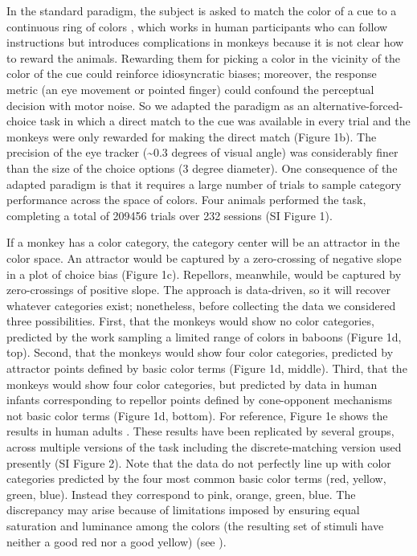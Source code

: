 In the standard paradigm, the subject is asked to match the color of a cue to a continuous ring of colors \citep{wilken_detection_2004,zhang_discrete_2008,bae_why_2015,panichello_error-correcting_2019,schurgin_psychophysical_2020}, which works in human participants who can follow instructions but introduces complications in monkeys because it is not clear how to reward the animals. Rewarding them for picking a color in the vicinity of the color of the cue could reinforce idiosyncratic biases\citep{panichello_error-correcting_2019}; moreover, the response metric (an eye movement or pointed finger) could confound the perceptual decision with motor noise. So we adapted the paradigm as an alternative-forced-choice task in which a direct match to the cue was available in every trial and the monkeys were only rewarded for making the direct match (Figure 1b). The precision of the eye tracker (\textasciitilde0.3 degrees of visual angle) was considerably finer than the size of the choice options (3 degree diameter). One consequence of the adapted paradigm is that it requires a large number of trials to sample category performance across the space of colors. Four animals performed the task, completing a total of 209456 trials over 232 sessions (SI Figure 1).

If a monkey has a color category, the category center will be an attractor in the color space. An attractor would be captured by a zero-crossing of negative slope in a plot of choice bias (Figure 1c). Repellors, meanwhile, would be captured by zero-crossings of positive slope. The approach is data-driven, so it will recover whatever categories exist; nonetheless, before collecting the data we considered three possibilities. First, that the monkeys would show no color categories, predicted by the work sampling a limited range of colors in baboons \citep{davidoff_cross-species_2010} (Figure 1d, top). Second, that the monkeys would show four color categories, predicted by attractor points defined by basic color terms (Figure 1d, middle). Third, that the monkeys would show four color categories, but predicted by data in human infants corresponding to repellor points defined by cone-opponent mechanisms not basic color terms \citep{skelton_biological_2017} (Figure 1d, bottom). For reference, Figure 1e shows the results in human adults \citep{panichello_error-correcting_2019}. These results have been replicated by several groups, across multiple versions of the task including the discrete-matching version used presently (SI Figure 2). Note that the data do not perfectly line up with color categories predicted by the four most common basic color terms (red, yellow, green, blue). Instead they correspond to pink, orange, green, blue. The discrepancy may arise because of limitations imposed by ensuring equal saturation and luminance among the colors (the resulting set of stimuli have neither a good red nor a good yellow) (see \citep{bae_why_2015}). 
